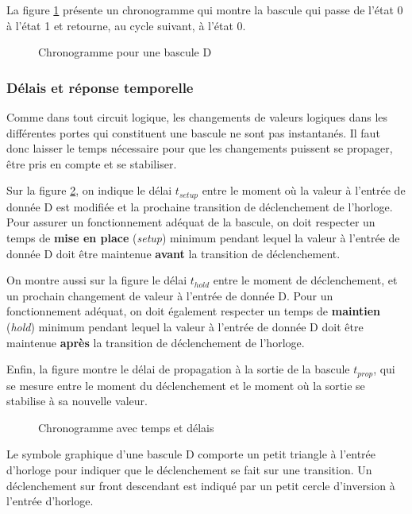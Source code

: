 \documentclass[11pt]{article}
\begin{document}
La figure \ref{fig:orgbd46f46} présente un chronogramme qui montre la bascule
qui passe de l'état 0 à l'état 1 et retourne, au cycle suivant, à
l'état 0.

\begin{figure}[htbp]
\centering

\caption{\label{fig:orgbd46f46}Chronogramme pour une bascule D}
\end{figure}

\subsubsection{Délais et réponse temporelle}
\label{sec:org59726bb}

Comme dans tout circuit logique, les changements de valeurs logiques
dans les différentes portes qui constituent une bascule ne sont pas
instantanés. Il faut donc laisser le temps nécessaire pour que les
changements puissent se propager, être pris en compte et se stabiliser.

Sur la figure \ref{fig:org3160af3}, on indique le délai \(t_{setup}\) entre le
moment où la valeur à l'entrée de donnée D est modifiée et la
prochaine transition de déclenchement de l'horloge. Pour assurer un
fonctionnement adéquat de la bascule, on doit respecter un temps de
\textbf{mise en place} (\emph{setup}) minimum pendant lequel la valeur à l'entrée
de donnée D doit être maintenue \textbf{avant} la transition de
déclenchement.

On montre aussi sur la figure le délai \(t_{hold}\) entre le moment de
déclenchement, et un prochain changement de valeur à l'entrée de
donnée D. Pour un fonctionnement adéquat, on doit également respecter
un temps de \textbf{maintien} (\emph{hold}) minimum pendant lequel la valeur à
l'entrée de donnée D doit être maintenue \textbf{après} la transition de
déclenchement de l'horloge.

Enfin, la figure montre le délai de propagation à la sortie de la
bascule \(t_{prop}\), qui se mesure entre le moment du déclenchement et
le moment où la sortie se stabilise à sa nouvelle valeur.

\begin{figure}[htbp]
\centering

\caption{\label{fig:org3160af3}Chronogramme avec temps et délais}
\end{figure}

Le symbole graphique d'une bascule D comporte un petit triangle à
l'entrée d'horloge pour indiquer que le déclenchement se fait sur une
transition. Un déclenchement sur front descendant est indiqué par un
petit cercle d'inversion à l'entrée d'horloge.
\end{document}
